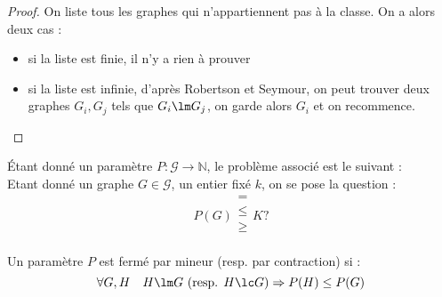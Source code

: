 \documentclass[a4paper, 11pt]{thesis}
\begin{document}
\begin{proof}
    On liste tous les graphes qui n'appartiennent pas à la classe. On a alors deux cas :
    \begin{itemize}
        \item si la liste est finie, il n'y a rien à prouver
        \item si la liste est infinie, d'après Robertson et Seymour, on peut trouver deux graphes
            $G_i, G_j$ tels que $G_i \lm G_j$, on garde alors $G_i$ et on recommence.
    \end{itemize}
\end{proof}

\begin{df}
    Étant donné un paramètre $P : \mathcal{G} \longrightarrow \mathbb{N}$, le problème associé est
    le suivant : \\
    Etant donné un graphe $G \in \mathcal{G}$, un entier fixé $k$, on se pose la question :
    \begin{displaymath}
        P(G) \left . \begin{array}{c}
            = \\ \leq \\ \geq \\
        \end{array}
        \right .
        K ?
    \end{displaymath}
\end{df}

\begin{df}
    Un paramètre $P$ est fermé par mineur (resp. par contraction) si :
    \begin{displaymath}
        \forall G, H \quad H \lm G\ (\mbox{resp. } H \lc G) \Rightarrow P(H) \leq P(G)
    \end{displaymath}
\end{df}





\end{document}
